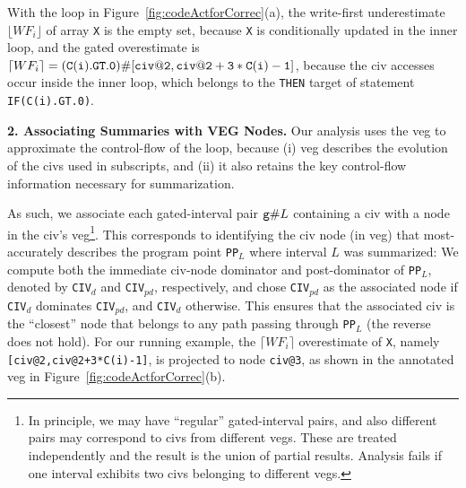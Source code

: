 \documentclass[10pt,nocopyrightspace]{sigplanconf}
\begin{document}
With the loop in Figure~\ref{fig:codeActforCorrec}(a), 
the write-first underestimate $\lfloor WF_i\rfloor$ of array {\tt X} 
is the empty set, because {\tt X} is conditionally updated in 
the inner loop, and the gated overestimate is  
$\lceil WF_i\rceil={\tt{}(C(i).GT.0)}\#[{\tt civ@2, civ@2+3*C(i)-1}]$,
because the {\sc civ} accesses occur inside the inner loop, which
belongs to the {\tt THEN} target of statement {\tt IF(C(i).GT.0)}.
 
\vspace{1ex}

{\bf 2. Associating Summaries with VEG Nodes.}
Our analysis uses the {\sc veg} to approximate the control-flow of
the loop, because (i) {\sc veg} describes the evolution of the 
{\sc civ}s used in subscripts, and (ii) it also retains the 
key control-flow information necessary for summarization. 

As such, we associate each gated-interval pair ${\tt g}\#L$ 
containing a {\sc civ} with a node in the {\sc civ}'s {\sc veg}\footnote{  
In principle, we may have ``regular'' gated-interval pairs, and also 
different pairs may correspond to {\sc civ}s from different {\sc veg}s. 
These are treated independently and the result is the union of partial results.
Analysis fails if one interval exhibits two {\sc civ}s belonging
to different {\sc veg}s.}. 
This corresponds to identifying the {\sc civ} node (in {\sc veg})
that most-accurately describes the program point {\tt PP$_L$} 
where interval $L$ was summarized:
%
We compute both the immediate {\sc civ}-node dominator and 
post-dominator of {\tt PP$_L$}, denoted by {\tt CIV}$_{d}$ and 
{\tt CIV}$_{pd}$, respectively, and chose {\tt CIV}$_{pd}$
as the associated node if {\tt CIV}$_{d}$ dominates {\tt CIV}$_{pd}$, 
and {\tt CIV}$_{d}$ otherwise. This ensures that the associated {\sc civ}
is the ``closest'' node that belongs to any path passing through {\tt PP$_L$}
(the reverse does not hold).
%
For our running example, the $\lceil WF_i\rceil$ overestimate of {\tt X}, 
namely {\tt [civ@2,civ@2+3*C(i)-1]}, is projected to node {\tt civ@3}, 
as shown in the annotated {\sc veg} in Figure~\ref{fig:codeActforCorrec}(b).
%
\end{document}
